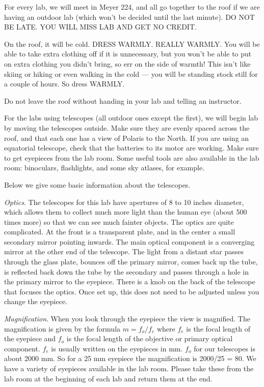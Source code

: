 
\medskip \noindent For every lab, we will meet in Meyer 224, and all
go together to the roof if we are having an outdoor lab (which won't
be decided until the last minute). DO NOT BE LATE.  YOU WILL MISS LAB
AND GET NO CREDIT.

\medskip \noindent On the roof, it will be cold. DRESS WARMLY. REALLY
WARMLY. You will be able to take extra clothing off if it is
unnecessary, but you won't be able to put on extra clothing you didn't
bring, so err on the side of warmth!  This isn't like skiing or hiking
or even walking in the cold --- you will be standing stock still for a
couple of hours. So dress WARMLY.

\medskip \noindent Do not leave the roof without handing in your lab
and telling an instructor.

\medskip \noindent For the labs using telescopes (all outdoor ones
except the first), we will begin lab by moving the telescopes outside.
Make sure they are evenly spaced across the roof, and that each one
has a view of Polaris to the North. If you are using an equatorial
telescope, check that the batteries to its motor are working. Make
sure to get eyepieces from the lab room. Some useful tools are also
available in the lab room: binoculars, flashlights, and some sky
atlases, for example. 

\medskip
\noindent
Below we give some basic information about the telescopes. 

\medskip
\noindent
\emph{Optics}. The telescopes for this lab have apertures of 8 to 10
inches diameter, which allows them to collect much more light than the
human eye (about 500 times more) so that we can see much fainter
objects.  The optics are quite complicated. At the front is a
transparent plate, and in the center a small secondary mirror pointing
inwards. The main optical component is a converging mirror at the
other end of the telescope. The light from a distant star passes
through the glass plate, bounces off the primary mirror, comes back up
the tube, is reflected back down the tube by the secondary and passes
through a hole in the primary mirror to the eyepiece.  There is a knob
on the back of the telescope that focuses the optics. Once set up,
this does not need to be adjusted unless you change the eyepiece.

\medskip \noindent \emph{Magnification}. When you look through the
eyepiece the view is magnified.  The magnification is given by the
formula $m = f_o/f_e$ where $f_e$ is the focal length of the eyepiece
and $f_o$ is the focal length of the objective or primary optical
component. $f_e$ is usually written on the eyepieces in mm. $f_o$ for
our telescopes is about 2000 mm. So for a 25 mm eyepiece the
magnification is 2000/25 = 80. We have a variety of eyepieces
available in the lab room. Please take these from the lab room at the
beginning of each lab and return them at the end.

